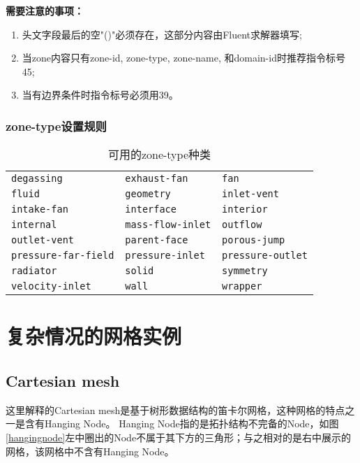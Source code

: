 \documentclass[lang=cn,11pt,a4paper]{elegantpaper} %
\begin{document}
\textbf{需要注意的事项：}
\begin{enumerate}
  \item 头文字段最后的空"()"必须存在，这部分内容由Fluent求解器填写;
  \item 当zone内容只有zone-id, zone-type, zone-name, 和domain-id时推荐指令标号45;
  \item 当有边界条件时指令标号必须用39。
\end{enumerate}

\subsubsection{zone-type设置规则}\label{zone-type}
\begin{table}[!htb]
  \centering
  \caption{可用的zone-type种类}
  \begin{tabular}{*{3}{l}}
   \hline
   \texttt{degassing}       & \texttt{exhaust-fan}   & \texttt{fan} \\
   \texttt{fluid}           & \texttt{geometry}      & \texttt{inlet-vent} \\
   \texttt{intake-fan}      & \texttt{interface}     & \texttt{interior} \\
   \texttt{internal}        & \texttt{mass-flow-inlet}          & \texttt{outflow} \\
   \texttt{outlet-vent}     & \texttt{parent-face}   & \texttt{porous-jump} \\
   \texttt{pressure-far-field}         & \texttt{pressure-inlet}     & \texttt{pressure-outlet} \\
   \texttt{radiator}        & \texttt{solid}         & \texttt{symmetry} \\
   \texttt{velocity-inlet}  & \texttt{wall}          & \texttt{wrapper} \\
   \hline
  \end{tabular}
\end{table}


\section{复杂情况的网格实例}

\subsection{Cartesian mesh}\label{Cartesianmesh}

这里解释的Cartesian mesh是基于树形数据结构的笛卡尔网格，这种网格的特点之一是含有Hanging Node。
Hanging Node指的是拓扑结构不完备的Node，如图\ref{hangingnode}左中圈出的Node不属于其下方的三角形；与之相对的是右中展示的网格，该网格中不含有Hanging Node。
\end{document}
